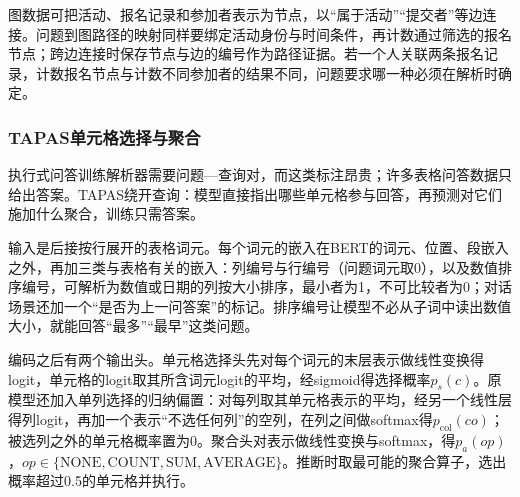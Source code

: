 图数据可把活动、报名记录和参加者表示为节点，以“属于活动”“提交者”等边连接。问题到图路径的映射同样要绑定活动身份与时间条件，再计数通过筛选的报名节点；跨边连接时保存节点与边的编号作为路径证据。若一个人关联两条报名记录，计数报名节点与计数不同参加者的结果不同，问题要求哪一种必须在解析时确定。

\subsubsection{TAPAS单元格选择与聚合}
\label{sec:nlp-dialogue-tapas}

执行式问答训练解析器需要问题—查询对，而这类标注昂贵；许多表格问答数据只给出答案。TAPAS绕开查询：模型直接指出哪些单元格参与回答，再预测对它们施加什么聚合，训练只需答案。

输入是后接按行展开的表格词元。每个词元的嵌入在BERT的词元、位置、段嵌入之外，再加三类与表格有关的嵌入：列编号与行编号（问题词元取0），以及数值排序编号，可解析为数值或日期的列按大小排序，最小者为1，不可比较者为0；对话场景还加一个“是否为上一问答案”的标记。排序编号让模型不必从子词中读出数值大小，就能回答“最多”“最早”这类问题。

编码之后有两个输出头。单元格选择头先对每个词元的末层表示做线性变换得logit，单元格的logit取其所含词元logit的平均，经sigmoid得选择概率$p_s(c)$。原模型还加入单列选择的归纳偏置：对每列取其单元格表示的平均，经另一个线性层得列logit，再加一个表示“不选任何列”的空列，在列之间做softmax得$p_{\mathrm{col}}(\mathit{co})$；被选列之外的单元格概率置为0。聚合头对\code{[CLS]}表示做线性变换与softmax，得$p_a(\mathit{op})$，$\mathit{op}\in\{\text{NONE},\text{COUNT},\text{SUM},\text{AVERAGE}\}$。推断时取最可能的聚合算子，选出概率超过0.5的单元格并执行。

